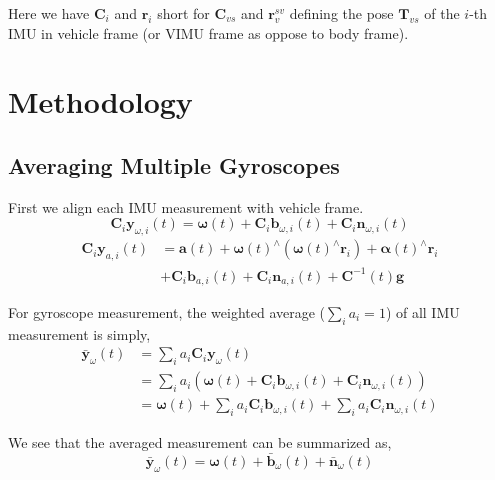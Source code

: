 \documentclass[conference]{IEEEtran}
\begin{document}
Here we have $\textbf{C}_i$ and $\textbf{r}_i$ short for $\textbf{C}_{vs}$ and $\textbf{r}_v^{sv}$ defining the pose $\textbf{T}_{vs}$ of the $i$-th IMU in vehicle frame (or VIMU frame as oppose to body frame).

\section{Methodology}\label{methodology}

\subsection{Averaging Multiple Gyroscopes}

First we align each IMU measurement with vehicle frame.
\begin{equation}
    \textbf{C}_{i} \textbf{y}_{\omega,i}(t) = \bm{\omega}(t) + \textbf{C}_{i} \textbf{b}_{\omega, i}(t) + \textbf{C}_{i} \textbf{n}_{\omega,i}(t)
\end{equation}
\begin{equation}\label{eqn_accel}
\begin{split}
    \textbf{C}_{i} \textbf{y}_{a,i}(t) &= \textbf{a}(t) + \bm{\omega}(t)^\wedge (\bm{\omega}(t)^\wedge \textbf{r}_i) + \bm{\alpha}(t)^\wedge \textbf{r}_i \\
    &+ \textbf{C}_{i} \textbf{b}_{a,i}(t) + \textbf{C}_{i} \textbf{n}_{a,i}(t) + \textbf{C}^{-1}(t)\textbf{g}
\end{split}
\end{equation}

For gyroscope measurement, the weighted average ($\sum_i{a_i} = 1$) of all IMU measurement is simply,
\begin{equation}
\begin{split}
    \bar{\textbf{y}}_\omega(t) &= \sum_i{a_i \textbf{C}_{i} \textbf{y}_\omega(t)} \\
    &= \sum_i{a_i \left( \bm{\omega}(t) + \textbf{C}_{i} \textbf{b}_{\omega,i}(t) + \textbf{C}_{i} \textbf{n}_{\omega,i}(t) \right)} \\
    &= \bm{\omega}(t) + \sum_i{a_i \textbf{C}_{i} \textbf{b}_{\omega,i}(t)} + \sum_i{a_i \textbf{C}_{i} \textbf{n}_{\omega,i}(t)}
\end{split}
\end{equation}

We see that the averaged measurement can be summarized as,
\begin{equation}
    \bar{\textbf{y}}_\omega(t) = \bm{\omega}(t) + \bar{\textbf{b}}_\omega(t) + \bar{\textbf{n}}_\omega(t)
\end{equation}
\end{document}
